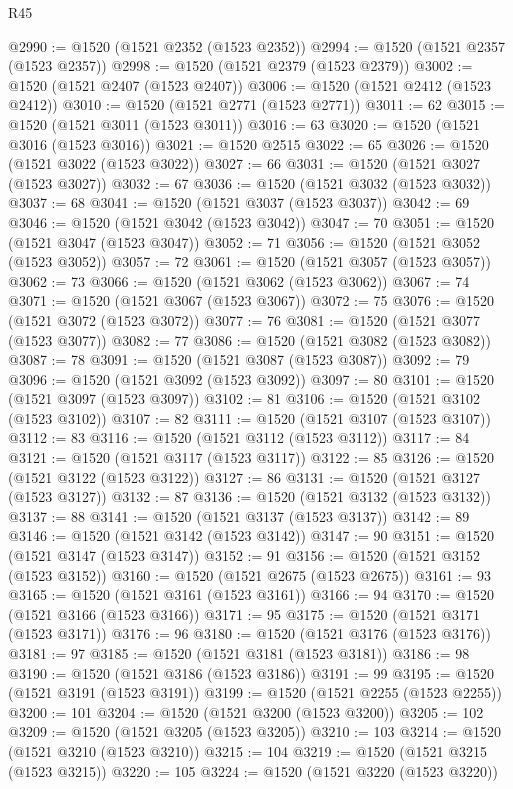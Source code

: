 \begin{lexlean}{R45}
\begin{coremodule}
{@2990 := @1520 (@1521 @2352 (@1523 @2352))
@2994 := @1520 (@1521 @2357 (@1523 @2357))
@2998 := @1520 (@1521 @2379 (@1523 @2379))
@3002 := @1520 (@1521 @2407 (@1523 @2407))
@3006 := @1520 (@1521 @2412 (@1523 @2412))
@3010 := @1520 (@1521 @2771 (@1523 @2771))
@3011 := 62
@3015 := @1520 (@1521 @3011 (@1523 @3011))
@3016 := 63
@3020 := @1520 (@1521 @3016 (@1523 @3016))
@3021 := @1520 @2515
@3022 := 65
@3026 := @1520 (@1521 @3022 (@1523 @3022))
@3027 := 66
@3031 := @1520 (@1521 @3027 (@1523 @3027))
@3032 := 67
@3036 := @1520 (@1521 @3032 (@1523 @3032))
@3037 := 68
@3041 := @1520 (@1521 @3037 (@1523 @3037))
@3042 := 69
@3046 := @1520 (@1521 @3042 (@1523 @3042))
@3047 := 70
@3051 := @1520 (@1521 @3047 (@1523 @3047))
@3052 := 71
@3056 := @1520 (@1521 @3052 (@1523 @3052))
@3057 := 72
@3061 := @1520 (@1521 @3057 (@1523 @3057))
@3062 := 73
@3066 := @1520 (@1521 @3062 (@1523 @3062))
@3067 := 74
@3071 := @1520 (@1521 @3067 (@1523 @3067))
@3072 := 75
@3076 := @1520 (@1521 @3072 (@1523 @3072))
@3077 := 76
@3081 := @1520 (@1521 @3077 (@1523 @3077))
@3082 := 77
@3086 := @1520 (@1521 @3082 (@1523 @3082))
@3087 := 78
@3091 := @1520 (@1521 @3087 (@1523 @3087))
@3092 := 79
@3096 := @1520 (@1521 @3092 (@1523 @3092))
@3097 := 80
@3101 := @1520 (@1521 @3097 (@1523 @3097))
@3102 := 81
@3106 := @1520 (@1521 @3102 (@1523 @3102))
@3107 := 82
@3111 := @1520 (@1521 @3107 (@1523 @3107))
@3112 := 83
@3116 := @1520 (@1521 @3112 (@1523 @3112))
@3117 := 84
@3121 := @1520 (@1521 @3117 (@1523 @3117))
@3122 := 85
@3126 := @1520 (@1521 @3122 (@1523 @3122))
@3127 := 86
@3131 := @1520 (@1521 @3127 (@1523 @3127))
@3132 := 87
@3136 := @1520 (@1521 @3132 (@1523 @3132))
@3137 := 88
@3141 := @1520 (@1521 @3137 (@1523 @3137))
@3142 := 89
@3146 := @1520 (@1521 @3142 (@1523 @3142))
@3147 := 90
@3151 := @1520 (@1521 @3147 (@1523 @3147))
@3152 := 91
@3156 := @1520 (@1521 @3152 (@1523 @3152))
@3160 := @1520 (@1521 @2675 (@1523 @2675))
@3161 := 93
@3165 := @1520 (@1521 @3161 (@1523 @3161))
@3166 := 94
@3170 := @1520 (@1521 @3166 (@1523 @3166))
@3171 := 95
@3175 := @1520 (@1521 @3171 (@1523 @3171))
@3176 := 96
@3180 := @1520 (@1521 @3176 (@1523 @3176))
@3181 := 97
@3185 := @1520 (@1521 @3181 (@1523 @3181))
@3186 := 98
@3190 := @1520 (@1521 @3186 (@1523 @3186))
@3191 := 99
@3195 := @1520 (@1521 @3191 (@1523 @3191))
@3199 := @1520 (@1521 @2255 (@1523 @2255))
@3200 := 101
@3204 := @1520 (@1521 @3200 (@1523 @3200))
@3205 := 102
@3209 := @1520 (@1521 @3205 (@1523 @3205))
@3210 := 103
@3214 := @1520 (@1521 @3210 (@1523 @3210))
@3215 := 104
@3219 := @1520 (@1521 @3215 (@1523 @3215))
@3220 := 105
@3224 := @1520 (@1521 @3220 (@1523 @3220))
}
\end{coremodule}
\end{lexlean}
